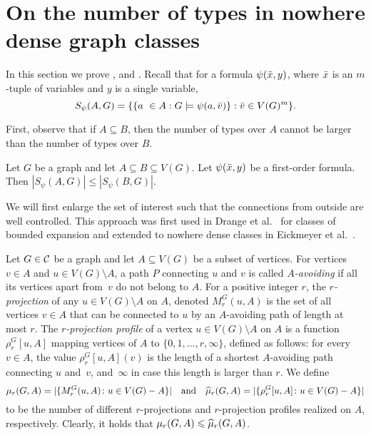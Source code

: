 \section{On the number of types in nowhere dense graph classes}

In this section we prove ,  and . Recall that for a
formula $\psi(\bar{x},y)$, where 
$\bar{x}$ is an $m$-tuple of variables and $y$ is a single variable, 
\[S_\psi(A,G)=\{\{a\ \in A : G\models\psi(a,\tup v)\} : \tup v\in V(G)^m\}.\]

First, observe that if $A\subseteq B$, then the number of types
over $A$ cannot be larger than the number of types over $B$. 

\begin{lemma}\label{lem:types-over-B}
Let $G$ be a graph and let $A\subseteq B\subseteq V(G)$. Let 
$\psi(\bar{x},y)$ be a first-order formula. Then 
$|S_\psi(A,G)|\leq |S_\psi(B,G)|$. 
\end{lemma}

We will first enlarge the set of interest such 
that the connections from outside are well controlled. This approach
was first used in Drange et al.~\cite{drange2016kernelization} for
classes of bounded expansion and extended to nowhere dense
classes in Eickmeyer et al.~\cite{eickmeyer2016neighborhood}. 

Let $G\in \mathcal{C}$ be a graph and let $A\subseteq V(G)$ be a subset of vertices. For vertices $v\in A$ and $u\in V(G)\setminus A$, a path $P$ connecting $u$ and $v$ is called {\em{$A$-avoiding}}
if all its vertices apart from~$v$ do not belong to $A$. For a positive integer $r$, the {\em{$r$-projection}} of any $u\in V(G)\setminus A$ on $A$, denoted $M^G_r(u,A)$ is the set of all vertices $v\in A$ that
can be connected to $u$ by an $A$-avoiding path of length at most $r$. The {\em{$r$-projection profile}} of a vertex $u\in V(G)\setminus A$ on $A$ is a function $\rho^G_r[u,A]$ mapping vertices of
$A$ to $\{0,1,\ldots,r,\infty\}$, defined as follows: for every $v\in A$, the value $\rho^G_r[u,A](v)$ is the length of a shortest $A$-avoiding path connecting $u$ and~$v$, and~$\infty$ in case this length
is larger than $r$. We define 
\[\mu_r(G,A)=|\{M_r^G(u,A)\colon u\in V(G)- A\}|\quad\textrm{and}\quad \widehat{\mu}_r(G,A)=|\{\rho_r^G[u,A]\colon u\in V(G)- A\}|\]
to be the number of different $r$-projections and $r$-projection profiles realized on $A$, respectively. Clearly, it holds that $\mu_r(G,A)\leqslant \widehat{\mu}_r(G,A)$.

